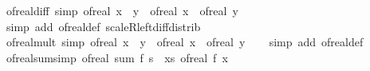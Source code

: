 \begin{isabellebody}
\endisatagproof
{\isafoldproof}%
%
\isadelimproof
\isanewline
%
\endisadelimproof
\isanewline
{}\isamarkupfalse%
\ of{\isacharunderscore}{\kern0pt}real{\isacharunderscore}{\kern0pt}diff\ {\isacharbrackleft}{\kern0pt}simp{\isacharbrackright}{\kern0pt}{\isacharcolon}{\kern0pt}\ {\isachardoublequoteopen}of{\isacharunderscore}{\kern0pt}real\ {\isacharparenleft}{\kern0pt}x\ {\isacharminus}{\kern0pt}\ y{\isacharparenright}{\kern0pt}\ {\isacharequal}{\kern0pt}\ of{\isacharunderscore}{\kern0pt}real\ x\ {\isacharminus}{\kern0pt}\ of{\isacharunderscore}{\kern0pt}real\ y{\isachardoublequoteclose}\isanewline
%
\isadelimproof
\ \ %
\endisadelimproof
%
\isatagproof
{}\isamarkupfalse%
\ {\isacharparenleft}{\kern0pt}simp\ add{\isacharcolon}{\kern0pt}\ of{\isacharunderscore}{\kern0pt}real{\isacharunderscore}{\kern0pt}def\ scaleR{\isacharunderscore}{\kern0pt}left{\isacharunderscore}{\kern0pt}diff{\isacharunderscore}{\kern0pt}distrib{\isacharparenright}{\kern0pt}%
\endisatagproof
{\isafoldproof}%
%
\isadelimproof
\isanewline
%
\endisadelimproof
\isanewline
{}\isamarkupfalse%
\ of{\isacharunderscore}{\kern0pt}real{\isacharunderscore}{\kern0pt}mult\ {\isacharbrackleft}{\kern0pt}simp{\isacharbrackright}{\kern0pt}{\isacharcolon}{\kern0pt}\ {\isachardoublequoteopen}of{\isacharunderscore}{\kern0pt}real\ {\isacharparenleft}{\kern0pt}x\ {\isacharasterisk}{\kern0pt}\ y{\isacharparenright}{\kern0pt}\ {\isacharequal}{\kern0pt}\ of{\isacharunderscore}{\kern0pt}real\ x\ {\isacharasterisk}{\kern0pt}\ of{\isacharunderscore}{\kern0pt}real\ y{\isachardoublequoteclose}\isanewline
%
\isadelimproof
\ \ %
\endisadelimproof
%
\isatagproof
{}\isamarkupfalse%
\ {\isacharparenleft}{\kern0pt}simp\ add{\isacharcolon}{\kern0pt}\ of{\isacharunderscore}{\kern0pt}real{\isacharunderscore}{\kern0pt}def{\isacharparenright}{\kern0pt}%
\endisatagproof
{\isafoldproof}%
%
\isadelimproof
\isanewline
%
\endisadelimproof
\isanewline
{}\isamarkupfalse%
\ of{\isacharunderscore}{\kern0pt}real{\isacharunderscore}{\kern0pt}sum{\isacharbrackleft}{\kern0pt}simp{\isacharbrackright}{\kern0pt}{\isacharcolon}{\kern0pt}\ {\isachardoublequoteopen}of{\isacharunderscore}{\kern0pt}real\ {\isacharparenleft}{\kern0pt}sum\ f\ s{\isacharparenright}{\kern0pt}\ {\isacharequal}{\kern0pt}\ {\isacharparenleft}{\kern0pt}{\isasymSum}x{\isasymin}s{\isachardot}{\kern0pt}\ of{\isacharunderscore}{\kern0pt}real\ {\isacharparenleft}{\kern0pt}f\ x{\isacharparenright}{\kern0pt}{\isacharparenright}{\kern0pt}{\isachardoublequoteclose}\isanewline
%
\isadelimproof
\ \ %
\endisadelimproof

\end{isabellebody}
